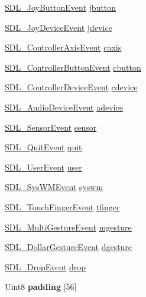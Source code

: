 \begin{DoxyCompactItemize}
\item 
\hyperlink{structSDL__JoyButtonEvent}{S\+D\+L\+\_\+\+Joy\+Button\+Event} \hyperlink{unionSDL__Event_a591104d64903ae1cf70874fb5d3124ff}{jbutton}
\item 
\hyperlink{structSDL__JoyDeviceEvent}{S\+D\+L\+\_\+\+Joy\+Device\+Event} \hyperlink{unionSDL__Event_a17514dc19a846ea1b5fbe44123700c4c}{jdevice}
\item 
\hyperlink{structSDL__ControllerAxisEvent}{S\+D\+L\+\_\+\+Controller\+Axis\+Event} \hyperlink{unionSDL__Event_aa8f6df0f2716fae56204b12ab4a4c289}{caxis}
\item 
\hyperlink{structSDL__ControllerButtonEvent}{S\+D\+L\+\_\+\+Controller\+Button\+Event} \hyperlink{unionSDL__Event_aee2b5671c8dcdb447023715cc21593cb}{cbutton}
\item 
\hyperlink{structSDL__ControllerDeviceEvent}{S\+D\+L\+\_\+\+Controller\+Device\+Event} \hyperlink{unionSDL__Event_ad3beed01e690b885728e0b0e1d636378}{cdevice}
\item 
\hyperlink{structSDL__AudioDeviceEvent}{S\+D\+L\+\_\+\+Audio\+Device\+Event} \hyperlink{unionSDL__Event_a111e01fcac4fd8e251a6058ff9f17e72}{adevice}
\item 
\hyperlink{structSDL__SensorEvent}{S\+D\+L\+\_\+\+Sensor\+Event} \hyperlink{unionSDL__Event_af0da8e4a59228360984595125062eb2f}{sensor}
\item 
\hyperlink{structSDL__QuitEvent}{S\+D\+L\+\_\+\+Quit\+Event} \hyperlink{unionSDL__Event_a102a3008afe67a1c02ae7504e232dcef}{quit}
\item 
\hyperlink{structSDL__UserEvent}{S\+D\+L\+\_\+\+User\+Event} \hyperlink{unionSDL__Event_ab7c394e3ce7bf1e4f8d68bc0e9f1b042}{user}
\item 
\hyperlink{structSDL__SysWMEvent}{S\+D\+L\+\_\+\+Sys\+W\+M\+Event} \hyperlink{unionSDL__Event_ab3b2eaf5348d4c50a51b1f297fdef537}{syswm}
\item 
\hyperlink{structSDL__TouchFingerEvent}{S\+D\+L\+\_\+\+Touch\+Finger\+Event} \hyperlink{unionSDL__Event_ab18d7d60794cb056948ffa58541bc3c5}{tfinger}
\item 
\hyperlink{structSDL__MultiGestureEvent}{S\+D\+L\+\_\+\+Multi\+Gesture\+Event} \hyperlink{unionSDL__Event_ac19b3c6a6b5181a51eb4fbe2cbe726a9}{mgesture}
\item 
\hyperlink{structSDL__DollarGestureEvent}{S\+D\+L\+\_\+\+Dollar\+Gesture\+Event} \hyperlink{unionSDL__Event_a4481167b9f8549aeb254e97ca812e74d}{dgesture}
\item 
\hyperlink{structSDL__DropEvent}{S\+D\+L\+\_\+\+Drop\+Event} \hyperlink{unionSDL__Event_acff77bccbca65abbb876360a3f5209c9}{drop}
\item 
\mbox{\label{unionSDL__Event_aabb599570edfa54aad6255c1f24f2ad2}} 
Uint8 {\bfseries padding} \mbox{[}56\mbox{]}
\end{DoxyCompactItemize}


